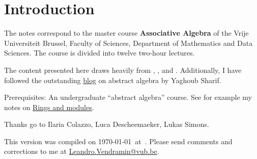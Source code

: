 \thispagestyle{plain}
\section*{Introduction}

The notes correspond to the master  
course \textbf{Associative Algebra} of the 
Vrije Universiteit Brussel, 
Faculty of Sciences, 
Department of Mathematics and Data Sciences. The course
is divided into twelve two-hour lectures. 

The content presented here draws heavily from \cite{MR3308118}, \cite{MR1449137}, 
and \cite{MR798076}. Additionally, I have 
followed the outstanding \href{https://ysharifi.wordpress.com}{blog} on 
abstract algebra by Yaghoub Sharif.

Prerequisites: An undergraduate ``abstract algebra'' course. See for example
my notes on \href{https://github.com/vendramin/rings}{Rings and modules}. 

Thanks go to Ilaria Colazzo, 
Luca Descheemaeker, Lukas Simons.   

This version 
was compiled on \today~at~\currenttime.
Please send comments and corrections to me at \url{Leandro.Vendramin@vub.be}. 


